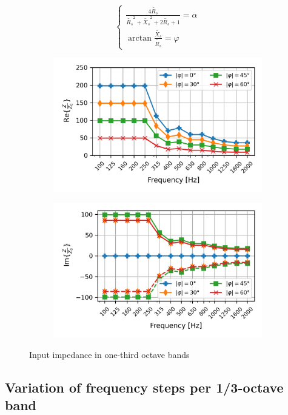 \begin{equation}
	\begin{cases}
		\frac{4\tilde{R_s}}{\tilde{R_s}^2+\tilde{X_s}^2 + 2\tilde{R_s} + 1} = \alpha\\
		\arctan{\frac{\tilde{X_s}}{\tilde{R_s}}} = \varphi
	\end{cases}	
	\label{eq:impedance}
\end{equation}


\begin{figure}[H]
	\centering
	\begin{subfigure}[b]{0.8\textwidth}
		\centering
		\includegraphics{fig/chap4/impedance/impedance_real.png}
	\end{subfigure}
	\begin{subfigure}[b]{0.8\textwidth}
		\centering
		\includegraphics{fig/chap4/impedance/impedance_imag.png}
	\end{subfigure}
	\caption{Input impedance in one-third octave bands}
\end{figure}


\subsection{Variation of frequency steps per 1/3-octave band}